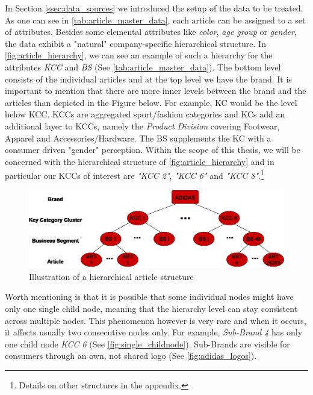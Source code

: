 
In Section \ref{ssec:data_sources} we introduced the setup of the data to be treated. As one can see in \autoref{tab:article_master_data}, each article can be assigned to a set of attributes. Besides some elemental attributes like \textit{color}, \textit{age group} or \textit{gender}, the data exhibit a "natural" company-specific hierarchical structure. In \autoref{fig:article_hierarchy}, we can see an example of such a hierarchy for the attributes \textit{\ac{KCC}} and \textit{\ac{BS}} (See \autoref{tab:article_master_data}). The bottom level consists of the individual articles and at the top level we have the brand. It is important to mention that there are more inner levels between the brand and the articles than depicted in the Figure below. For example, \ac{KC} would be the level below \ac{KCC}. \acp{KCC} are aggregated sport/fashion categories and \acp{KC} add an additional layer to \acp{KCC}, namely the \textit{Product Division} covering Footwear, Apparel and Accessories/Hardware. The \ac{BS} supplements the \ac{KC} with a consumer driven "gender" perception.
Within the scope of this thesis, we will be concerned with the hierarchical structure of \autoref{fig:article_hierarchy} and in particular our \acp{KCC} of interest are \textit{"KCC 2"}, \textit{"KCC 6"} and \textit{"KCC 8"}.\footnote{Details on other structures in the appendix.}

\begin{figure}[H]
\centering
  \includegraphics[width=0.95\linewidth]{figures/article_tree_KCC_BS.eps}
  \caption{Illustration of a hierarchical article structure}
  \label{fig:article_hierarchy}
\end{figure}

Worth mentioning is that it is possible that some individual nodes might have only one single child node, meaning that the hierarchy level can stay consistent across multiple nodes. This phenomenon however is very rare and when it occurs, it affects usually two consecutive nodes only. For example, \textit{Sub-Brand 4} has only one child node \textit{KCC 6} (See \autoref{fig:single_childnode}). Sub-Brands are visible for consumers through an own, not shared logo (See \autoref{fig:adidas_logos}).


